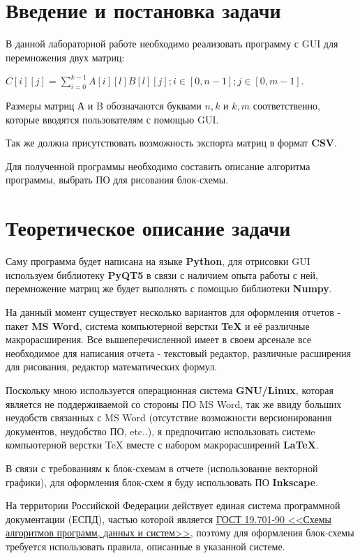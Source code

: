 \documentclass[a4paper,14pt]{extarticle}
\begin{document}
\section{Введение и постановка задачи}
В данной лабораторной работе необходимо реализовать программу с GUI для перемножения двух матриц:

$C[i][j] = \sum\limits_{i=0}^{k - 1} A[i][l]B[l][j]; i \in [0, n - 1]; j \in [0, m - 1]. $ 

Размеры матриц А и B обозначаются буквами $n, k$ и $k, m$ соответственно, которые вводятся пользователям с помощью GUI. 

Так же должна присутствовать возможность экспорта матриц в формат \textbf{CSV}. 

Для полученной программы необходимо составить описание алгоритма программы, выбрать ПО для рисования блок-схемы.

\section{Теоретическое описание задачи}
Саму программа будет написана на языке \textbf{Python}, для отрисовки GUI используем библиотеку \textbf{PyQT5} в связи с наличием опыта работы с ней, перемножение матриц же будет выполнять с помощью библиотеки \textbf{Numpy}.

На данный момент существует несколько вариантов для оформления отчетов - пакет \textbf{MS Word}, система компьютерной верстки \textbf{TeX} и её различные макрорасширения. Все вышеперечисленной имеет в своем арсенале все необходимое для написания отчета - текстовый редактор, различные расширения для рисования, редактор математических формул.

Поскольку мною используется операционная система \textbf{GNU/Linux}, которая является не поддерживаемой со стороны ПО MS Word, так же ввиду больших неудобств связанных с MS Word (отсутствие возможности версионирования документов, неудобство ПО, etc..), я предпочитаю использовать системe компьютерной верстки TeX вместе с набором макрорасширений \textbf{LaTeX}.

В связи с требованиям к блок-схемам в отчете (использование векторной графики), для оформления блок-схем я буду использовать ПО \textbf{Inkscape}.

На территории Российской Федерации действует единая система программной документации (ЕСПД), частью которой является 
\href{http://docs.cntd.ru/document/9041994}{ГОСТ 19.701-90 <<Схемы алгоритмов программ, данных и систем>>}, 
поэтому для оформления блок-схемы требуется использовать правила, 
описанные в указанной системе.
\end{document}
